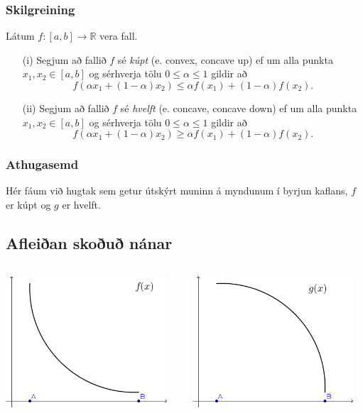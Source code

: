 \documentclass[icelandic,a4paper,12pt]{article}
\newcommand{\R}{{\mathbb  R}}
\begin{document}
\subsubsection{Skilgreining}
Látum $f:[a, b]\rightarrow \R$ vera fall.
\begin{enumerate}[(i)]\pause
\item[(i)] Segjum að fallið $f$ sé {\em kúpt} (e. convex, concave up)
ef um alla punkta $x_1, x_2\in [a, b]$ og sérhverja tölu $0\leq
\alpha\leq 1$ gildir að 
$$
	f(\alpha x_1+(1-\alpha)x_2)\leq \alpha f(x_1)+(1-\alpha)f(x_2).
$$
\pause
\item[(ii)] Segjum að fallið $f$ sé {\em hvelft} (e. concave, concave down)
ef um alla punkta $x_1, x_2\in [a, b]$ og sérhverja tölu $0\leq
\alpha\leq 1$ gildir að 
$$
	f(\alpha x_1+(1-\alpha)x_2)\geq \alpha f(x_1)+(1-\alpha)f(x_2).
$$
\end{enumerate}
 
\subsubsection{Athugasemd}
Hér fáum við hugtak sem getur útskýrt muninn á myndunum í byrjun kaflans, $f$ er kúpt og $g$ er hvelft.

\subsection{Afleiðan skoðuð nánar}
\begin{columns}[c] %
\begin{column}{.5\textwidth}
\includegraphics[width=6cm,keepaspectratio=true]{./myndir/kafli05/01_f1.png}
\end{column}
\begin{column}{.5\textwidth}
\includegraphics[width=6cm,keepaspectratio=true]{./myndir/kafli05/01_g1.png}
\end{column}
\end{columns}
\end{document}
